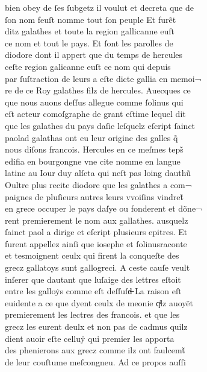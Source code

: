 \documentclass[12pt]{article}
\begin{document}
\newpage




bien obey de ſes ſubgetz il voulut et decreta que de\\
ſon nom feuſt
          nomme tout ſon peuple Et furẽt\\
ditz galathes et toute la region gallicanne
            euſt\\
ce nom et tout le pays. Et ſont les parolles de\\
diodore dont il appert que du temps de hercules\\
ceſte region galicanne euſt ce nom
          qui depuis\\
par ſuſtraction de leurs a eſte dicte gallia en memoi¬\\
re
          de ce Roy galathes filz de hercules. Auecques ce\\
que nous auons deſſus
          allegue comme ſolinus
            qui\\
eſt acteur comoſgraphe de grant eſtime lequel dit\\
que les
          galathes du pays daſie leſquelz eſcript ſainct\\
paolad galathas ont eu leur origine des
          galles q̃\\
nous diſons francois. Hercules en ce meſmes teps̃\\
edifia en bourgongne vne cite nomme
          en langue\\
latine au Iour duy alſeta qui neſt pas loing dauthũ\\
Oultre plus recite diodore que les
          galathes a com¬\\
paignes de pluſieurs autres leurs vvoiſins vindret̃\\
en grece occuper le pays daſye ou fonderent et dõne¬\\
rent premierement le
          nom aux gallathes. ausquelz\\
ſainct
            paol a dirige et eſcript plusieurs epitres. Et\\
furent appellez
          ainſi que iosephe et ſolinusraconte\\
et tesmoignent ceulx qui firent la
          conqueſte des\\
grecz gallatoys sunt gallogreci. A ceste cauſe veult\\
inſerer que dautant que luſaige des lettres eſtoit\\
entre les galloẏs comme
          eſt deſſuſd̶ La raison eſt\\
euidente a ce que dyent ceulx de meonie qͥlz
            auoyẽt\\
premierement les lectres des francois. et que les\\
grecz
          les eurent deulx et non pas de cadmus quilz\\
dient auoir eſte celluẏ qui premier les apporta\\
des phenierons aux grecz
          comme ilz ont faulcemt̃\\
de leur couſtume meſcongneu. Ad ce propos auſſi
\end{document}
